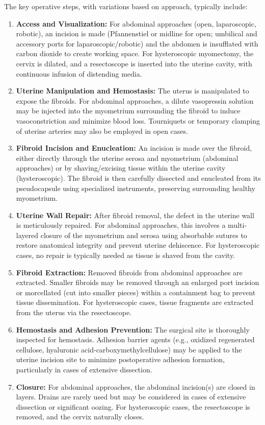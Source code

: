 The key operative steps, with variations based on approach, typically include:

\begin{enumerate}
  \item \textbf{Access and Visualization:} For abdominal approaches (open, laparoscopic, robotic), an incision is made (Pfannenstiel or midline for open; umbilical and accessory ports for laparoscopic/robotic) and the abdomen is insufflated with carbon dioxide to create working space. For hysteroscopic myomectomy, the cervix is dilated, and a resectoscope is inserted into the uterine cavity, with continuous infusion of distending media.
  
  \item \textbf{Uterine Manipulation and Hemostasis:} The uterus is manipulated to expose the fibroids. For abdominal approaches, a dilute vasopressin solution may be injected into the myometrium surrounding the fibroid to induce vasoconstriction and minimize blood loss. Tourniquets or temporary clamping of uterine arteries may also be employed in open cases.
  
  \item \textbf{Fibroid Incision and Enucleation:} An incision is made over the fibroid, either directly through the uterine serosa and myometrium (abdominal approaches) or by shaving/excising tissue within the uterine cavity (hysteroscopic). The fibroid is then carefully dissected and enucleated from its pseudocapsule using specialized instruments, preserving surrounding healthy myometrium.
  
  \item \textbf{Uterine Wall Repair:} After fibroid removal, the defect in the uterine wall is meticulously repaired. For abdominal approaches, this involves a multi-layered closure of the myometrium and serosa using absorbable sutures to restore anatomical integrity and prevent uterine dehiscence. For hysteroscopic cases, no repair is typically needed as tissue is shaved from the cavity.
  
  \item \textbf{Fibroid Extraction:} Removed fibroids from abdominal approaches are extracted. Smaller fibroids may be removed through an enlarged port incision or morcellated (cut into smaller pieces) within a containment bag to prevent tissue dissemination. For hysteroscopic cases, tissue fragments are extracted from the uterus via the resectoscope.
  
  \item \textbf{Hemostasis and Adhesion Prevention:} The surgical site is thoroughly inspected for hemostasis. Adhesion barrier agents (e.g., oxidized regenerated cellulose, hyaluronic acid-carboxymethylcellulose) may be applied to the uterine incision site to minimize postoperative adhesion formation, particularly in cases of extensive dissection.
  
  \item \textbf{Closure:} For abdominal approaches, the abdominal incision(s) are closed in layers. Drains are rarely used but may be considered in cases of extensive dissection or significant oozing. For hysteroscopic cases, the resectoscope is removed, and the cervix naturally closes.
\end{enumerate}

